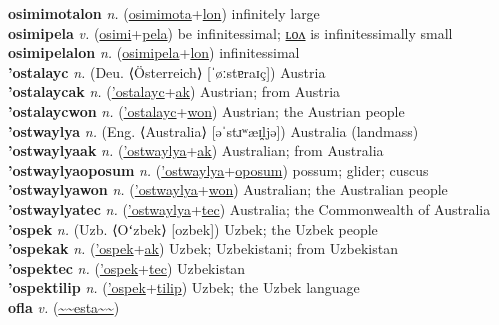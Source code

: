 \textbf{osimimotalon} \textit{n.} (\hyperref[osimimota]{osimimota}+\hyperref[lon]{lon})
infinitely large \label{osimimotalon} \\
\textbf{osimipela} \textit{v.} (\hyperref[osimi]{osimi}+\hyperref[pela]{pela})
be infinitessimal; \hyperref[osimipelalon]{ʟᴏᴧ} is infinitessimally small \label{osimipela} \\
\textbf{osimipelalon} \textit{n.} (\hyperref[osimipela]{osimipela}+\hyperref[lon]{lon})
infinitessimal \label{osimipelalon} \\
\textbf{'ostalayc} \textit{n.} (Deu. ⟨Österreich⟩ [ˈøːstɐraɪç])
Austria \label{'ostalayc} \\
\textbf{'ostalaycak} \textit{n.} (\hyperref['ostalayc]{'ostalayc}+\hyperref[ak]{ak})
Austrian; from Austria \label{'ostalaycak} \\
\textbf{'ostalaycwon} \textit{n.} (\hyperref['ostalayc]{'ostalayc}+\hyperref[won]{won})
Austrian; the Austrian people \label{'ostalaycwon} \\
\textbf{'ostwaylya} \textit{n.} (Eng. ⟨Australia⟩ [əˈstɹʷæɪ̯ljə])
Australia (landmass) \label{'ostwaylya} \\
\textbf{'ostwaylyaak} \textit{n.} (\hyperref['ostwaylya]{'ostwaylya}+\hyperref[ak]{ak})
Australian; from Australia \label{'ostwaylyaak} \\
\textbf{'ostwaylyaoposum} \textit{n.} (\hyperref['ostwaylya]{'ostwaylya}+\hyperref[oposum]{oposum})
possum; glider; cuscus \label{'ostwaylyaoposum} \\
\textbf{'ostwaylyawon} \textit{n.} (\hyperref['ostwaylya]{'ostwaylya}+\hyperref[won]{won})
Australian; the Australian people \label{'ostwaylyawon} \\
\textbf{'ostwaylyatec} \textit{n.} (\hyperref['ostwaylya]{'ostwaylya}+\hyperref[tec]{tec})
Australia; the Commonwealth of Australia \label{'ostwaylyatec} \\
\textbf{'ospek} \textit{n.} (Uzb. ⟨Oʻzbek⟩ [ozbek])
Uzbek; the Uzbek people \label{'ospek} \\
\textbf{'ospekak} \textit{n.} (\hyperref['ospek]{'ospek}+\hyperref[ak]{ak})
Uzbek; Uzbekistani; from Uzbekistan \label{'ospekak} \\
\textbf{'ospektec} \textit{n.} (\hyperref['ospek]{'ospek}+\hyperref[tec]{tec})
Uzbekistan \label{'ospektec} \\
\textbf{'ospektilip} \textit{n.} (\hyperref['ospek]{'ospek}+\hyperref[tilip]{tilip})
Uzbek; the Uzbek language \label{'ospektilip} \\
\textbf{ofla} \textit{v.} (\hyperref[esta]{\~{}\~{}esta\~{}\~{}})

